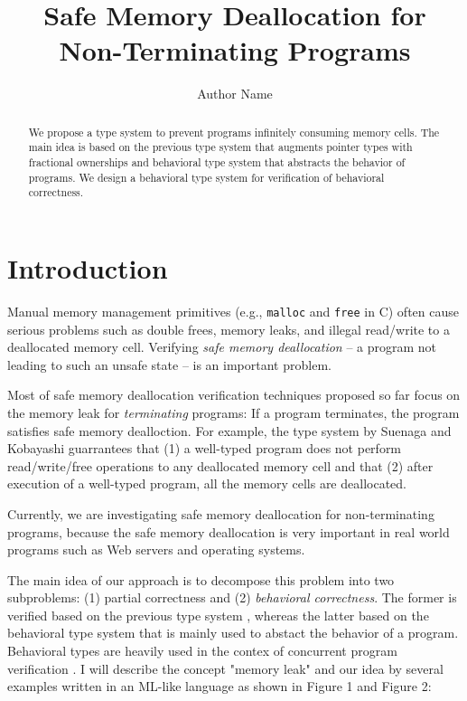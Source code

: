 \documentclass[english]{jssst_ppl} %
\title{Safe Memory Deallocation for Non-Terminating Programs}
\author{Author Name}
\begin{document}
\maketitle
\begin{abstract}
We propose a type system to prevent programs infinitely consuming memory cells. The main idea is based on the previous type system that augments pointer types with fractional ownerships and behavioral type system that abstracts the behavior of programs. We design a behavioral type system for verification of behavioral correctness.
\end{abstract}

\section{Introduction}
Manual memory management primitives (e.g., {\tt malloc} and {\tt free} in C) often cause serious problems such as double frees, memory leaks, and illegal read/write to a deallocated memory cell. Verifying \emph{safe memory deallocation} -- a program not leading to such an unsafe state -- is an important problem.

Most of safe memory deallocation verification techniques proposed so far \cite{DBLP:conf/aplas/SuenagaK09,DBLP:conf/pldi/HeineL03,DBLP:conf/sigsoft/XieA05,DBLP:journals/scp/SwamyHMGJ06} focus on the memory leak for \emph{terminating} programs: If a program terminates, the program satisfies safe memory dealloction. For example, the type system by Suenaga and Kobayashi \cite{DBLP:conf/aplas/SuenagaK09} guarrantees that (1) a well-typed program does not perform read/write/free operations to any deallocated memory cell and that (2) after execution of a well-typed program, all the memory cells are deallocated.

Currently, we are investigating safe memory deallocation for non-terminating programs, because the safe memory deallocation is very important in real world programs such as Web servers and operating systems.

The main idea of our approach is to decompose this problem into two subproblems: (1) partial correctness and (2) \emph{behavioral correctness}. The former is verified based on the previous type system \cite{DBLP:conf/aplas/SuenagaK09}, whereas the latter based on the behavioral type system that is mainly used to abstact the behavior of a program. Behavioral types are heavily used in the contex of concurrent program verification \cite{DBLP:journals/lmcs/KobayashiSW06,DBLP:journals/tcs/IgarashiK04,DBLP:conf/esop/HondaVK98}. I will describe the concept "memory leak" and  our idea by several examples written in an ML-like language as shown in Figure 1 and Figure 2:
\end{document}
